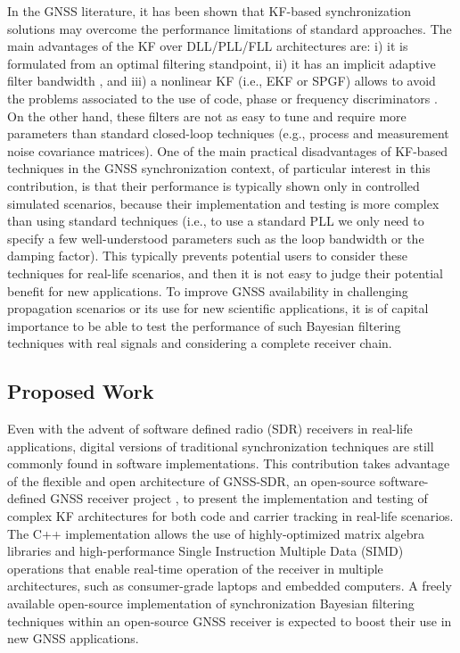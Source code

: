 In the GNSS literature, it has been shown that KF-based synchronization solutions \cite{Vila17c} may overcome the performance limitations of standard approaches. The main advantages of the KF over DLL/PLL/FLL architectures are: i) it is formulated from an optimal filtering standpoint, ii) it has an implicit adaptive filter bandwidth \cite{Vila-14a}, and iii) a nonlinear KF (i.e., EKF or SPGF) allows to avoid the problems associated to the use of code, phase or frequency discriminators \cite{Vila-14b}. On the other hand, these filters are not as easy to tune and require more parameters than standard closed-loop techniques (e.g., process and measurement noise covariance matrices). One of the main practical disadvantages of KF-based techniques in the GNSS synchronization context, of particular interest in this contribution, is that their performance is typically shown only in controlled simulated scenarios, because their implementation and testing is more complex than using standard techniques (i.e., to use a standard PLL we only need to specify a few well-understood parameters such as the loop bandwidth or the damping factor). This typically prevents potential users to consider these techniques for real-life scenarios, and then it is not easy to judge their potential benefit for new applications. To improve GNSS availability in challenging propagation scenarios or its use for new scientific applications, it is of capital importance to be able to test the performance of such Bayesian filtering techniques with real signals and considering a complete receiver chain.

\subsection{Proposed Work}

Even with the advent of software defined radio (SDR) receivers in real-life applications, digital versions of traditional synchronization techniques are still commonly found in software implementations. This contribution takes advantage of the flexible and open architecture of GNSS-SDR, an open-source software-defined GNSS receiver project \cite{GNSS-SDR11}, to present the implementation and testing of complex KF architectures for both code and carrier tracking in real-life scenarios. The C++ implementation allows the use of highly-optimized matrix algebra libraries and high-performance Single Instruction Multiple Data (SIMD) operations that enable real-time operation of the receiver in multiple architectures, such as consumer-grade laptops and embedded computers. A freely available open-source implementation of synchronization Bayesian filtering techniques within an open-source GNSS receiver is expected to boost their use in new GNSS applications.


